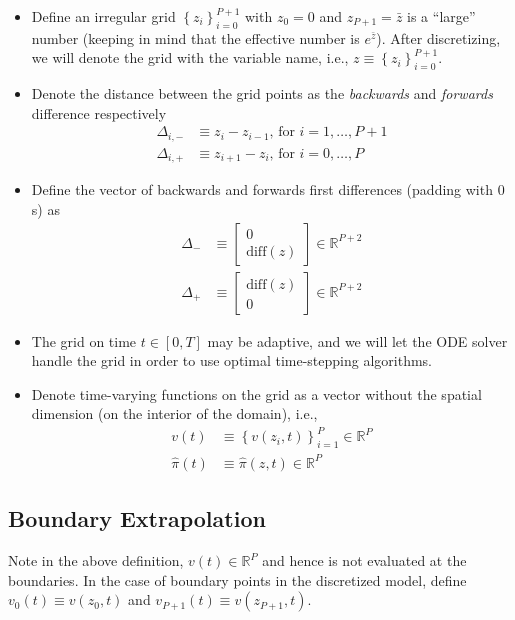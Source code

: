 \documentclass[11pt]{article}
\newcommand{\R}{\ensuremath{\mathbb{R}}}
\newcommand{\set}[1]{\ensuremath{\left\{{#1}\right\}}}
\begin{document}
\begin{itemize}
	\item Define an irregular  grid $\set{z_i}_{i=0}^{P+1}$ with $z_0 = 0$ and $z_{P+1} = \bar{z}$ is a ``large'' number (keeping in mind that the effective number is $e^{\bar{z}}$).  After discretizing, we will denote the grid with the variable name, i.e., $z \equiv \set{z_i}_{i=0}^{P+1}$.
	\item Denote the distance between the grid points as the \textit{backwards} and \textit{forwards} difference respectively
	\begin{align}
	\Delta_{i,-} &\equiv z_i - z_{i-1},\, \text{for } i = 1,\ldots, P+1\\
	\Delta_{i,+} &\equiv z_{i+1} - z_i,\, \text{for } i = 0,\ldots, P
	\end{align}
	\item Define the vector of backwards and forwards first differences (padding with $0$s) as
	\begin{align}
	\Delta_{-} &\equiv \begin{bmatrix} 0 \\
	\text{diff}(z)
	\end{bmatrix}\in\R^{P+2}\label{eq:Delta-minus}\\
	\Delta_{+} &\equiv \begin{bmatrix} \text{diff}(z)\\
	0
	\end{bmatrix}\in\R^{P+2}
	\end{align}\label{eq:Delta-plus}
	\item The grid on time $t \in [0,T]$ may be adaptive, and we will let the ODE solver handle the grid in order to use optimal time-stepping algorithms.
	\item Denote time-varying functions on the grid as a vector without the spatial dimension (on the interior of the domain), i.e.,
	\begin{align}
	v(t) &\equiv \set{v(z_i, t)}_{i=1}^P\in\R^P\\
	\hat{\pi}(t) &\equiv	\hat{\pi}(z,t) \in \R^P
	\end{align}
\end{itemize}

\subsection{Boundary Extrapolation}\label{sec:boundary-extrapolation}
Note in the above definition, $v(t) \in \R^P$ and hence is not evaluated at the boundaries.  In the case of boundary points in the discretized model, define $v_0(t) \equiv v(z_0, t)$ and $v_{P+1}(t) \equiv v(z_{P+1},t)$.
\end{document}
